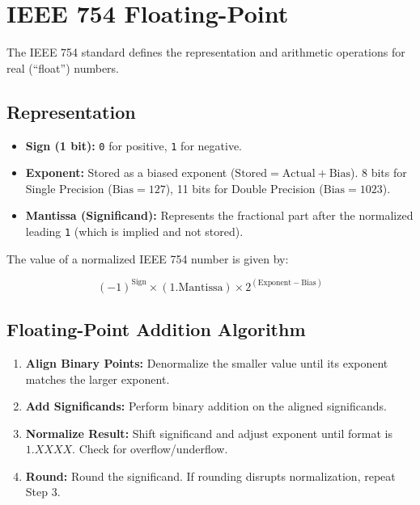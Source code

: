 \section{IEEE 754 Floating-Point}

The IEEE 754 standard defines the representation and arithmetic operations for real (``float'') numbers.

\subsection{Representation}

\begin{definition}

\begin{itemize}
    \item \textbf{Sign (1 bit):} \texttt{0} for positive, \texttt{1} for negative.
    \item \textbf{Exponent:} Stored as a biased exponent ($\text{Stored} = \text{Actual} + \text{Bias}$). 8 bits for Single Precision ($\text{Bias}=127$), 11 bits for Double Precision ($\text{Bias}=1023$).
    \item \textbf{Mantissa (Significand):} Represents the fractional part after the normalized leading \texttt{1} (which is implied and not stored).
\end{itemize}

\end{definition}

\medskip

\begin{proposition}
The value of a normalized IEEE 754 number is given by:

\begin{equation}
(-1)^{\text{Sign}} \times (1.\text{Mantissa}) \times 2^{(\text{Exponent} - \text{Bias})}
\end{equation}

\end{proposition}

\subsection{Floating-Point Addition Algorithm}

\begin{proposition}

\begin{enumerate}
    \item \textbf{Align Binary Points:} Denormalize the smaller value until its exponent matches the larger exponent.
    \item \textbf{Add Significands:} Perform binary addition on the aligned significands.
    \item \textbf{Normalize Result:} Shift significand and adjust exponent until format is $1.XXXX$. Check for overflow/underflow.
    \item \textbf{Round:} Round the significand. If rounding disrupts normalization, repeat Step 3.
\end{enumerate}

\end{proposition}

